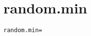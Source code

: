 \section{random.min}
\label{configuration:RandomMin}
\AvailableInJavaOnly{\TODO}
\begin{lstlisting}[style=Props,caption={Usage example for \textit{random.min}}]
random.min=
\end{lstlisting}